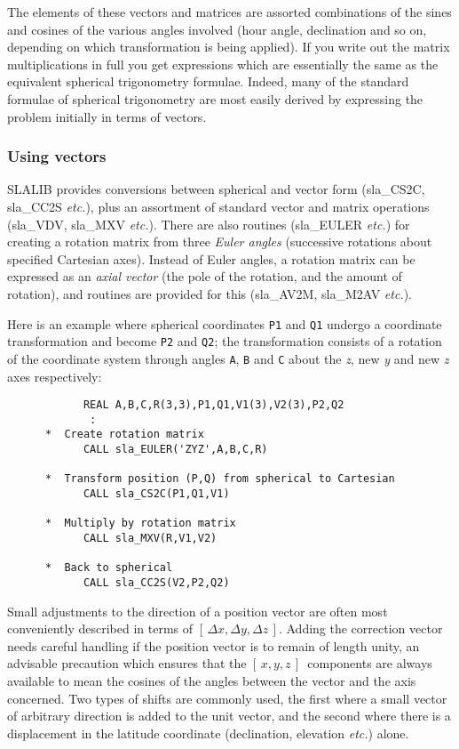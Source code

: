 \documentclass[11pt,twoside]{article}
\newcommand{\xyz}       {$[\,x,y,z\,]$}
\begin{document}
The elements of these vectors and matrices are assorted combinations of
the sines and cosines of the various angles involved (hour angle,
declination and so on, depending on which transformation is
being applied).  If you write out the matrix multiplications
in full you get expressions which are essentially the same as the
equivalent spherical trigonometry formulae.  Indeed, many of the
standard formulae of spherical trigonometry are most easily
derived by expressing the problem initially in
terms of vectors.

\subsubsection{Using vectors}
SLALIB provides conversions between spherical and vector
form
(sla\_CS2C,
sla\_CC2S
{\it etc.}), plus an assortment
of standard vector and matrix operations
(sla\_VDV,
sla\_MXV
{\it etc.}).
There are also routines
(sla\_EULER
{\it etc.}) for creating a rotation matrix
from three {\it Euler angles}\/ (successive rotations about
specified Cartesian axes).  Instead of Euler angles, a rotation
matrix can be expressed as an {\it axial vector}\/ (the pole of the rotation,
and the amount of rotation), and routines are provided for this
(sla\_AV2M,
sla\_M2AV
{\it etc.}).

Here is an example where spherical coordinates {\tt P1} and {\tt Q1}
undergo a coordinate transformation and become {\tt P2} and {\tt Q2};
the transformation consists of a rotation of the coordinate system
through angles {\tt A}, {\tt B} and {\tt C} about the
{\it z}, new {\it y}\/ and new {\it z}\/ axes respectively:
\goodbreak
\begin{verbatim}
            REAL A,B,C,R(3,3),P1,Q1,V1(3),V2(3),P2,Q2
             :
      *  Create rotation matrix
            CALL sla_EULER('ZYZ',A,B,C,R)

      *  Transform position (P,Q) from spherical to Cartesian
            CALL sla_CS2C(P1,Q1,V1)

      *  Multiply by rotation matrix
            CALL sla_MXV(R,V1,V2)

      *  Back to spherical
            CALL sla_CC2S(V2,P2,Q2)
\end{verbatim}
\goodbreak
Small adjustments to the direction of a position
vector are often most conveniently described in terms of
$[\,\Delta x,\Delta y, \Delta z\,]$.  Adding the correction
vector needs careful handling if the position
vector is to remain of length unity, an advisable precaution which
ensures that
the \xyz\ components are always available to mean the cosines of
the angles between the vector and the axis concerned.  Two types
of shifts are commonly used,
the first where a small vector of arbitrary direction is
added to the unit vector, and the second where there is a displacement
in the latitude coordinate (declination, elevation {\it etc.}) alone.
\end{document}
